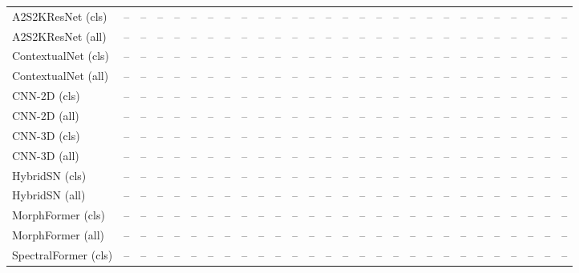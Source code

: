 \begin{longtable}{lrrrrrrrrrrrrrrrrrrrrrrrrrrr}
\addlinespace
A2S2KResNet (cls) & -- & -- & -- & -- & -- & -- & -- & -- & -- & -- & -- & -- & -- & -- & -- & -- & -- & -- & -- & -- & -- & -- & -- & -- & -- & -- & --\\*
A2S2KResNet (all) & -- & -- & -- & -- & -- & -- & -- & -- & -- & -- & -- & -- & -- & -- & -- & -- & -- & -- & -- & -- & -- & -- & -- & -- & -- & -- & --\\
\addlinespace
ContextualNet (cls) & -- & -- & -- & -- & -- & -- & -- & -- & -- & -- & -- & -- & -- & -- & -- & -- & -- & -- & -- & -- & -- & -- & -- & -- & -- & -- & --\\*
ContextualNet (all) & -- & -- & -- & -- & -- & -- & -- & -- & -- & -- & -- & -- & -- & -- & -- & -- & -- & -- & -- & -- & -- & -- & -- & -- & -- & -- & --\\
\addlinespace
CNN-2D (cls) & -- & -- & -- & -- & -- & -- & -- & -- & -- & -- & -- & -- & -- & -- & -- & -- & -- & -- & -- & -- & -- & -- & -- & -- & -- & -- & --\\*
CNN-2D (all) & -- & -- & -- & -- & -- & -- & -- & -- & -- & -- & -- & -- & -- & -- & -- & -- & -- & -- & -- & -- & -- & -- & -- & -- & -- & -- & --\\
\addlinespace
CNN-3D (cls) & -- & -- & -- & -- & -- & -- & -- & -- & -- & -- & -- & -- & -- & -- & -- & -- & -- & -- & -- & -- & -- & -- & -- & -- & -- & -- & --\\*
CNN-3D (all) & -- & -- & -- & -- & -- & -- & -- & -- & -- & -- & -- & -- & -- & -- & -- & -- & -- & -- & -- & -- & -- & -- & -- & -- & -- & -- & --\\
\addlinespace
HybridSN (cls) & -- & -- & -- & -- & -- & -- & -- & -- & -- & -- & -- & -- & -- & -- & -- & -- & -- & -- & -- & -- & -- & -- & -- & -- & -- & -- & --\\*
HybridSN (all) & -- & -- & -- & -- & -- & -- & -- & -- & -- & -- & -- & -- & -- & -- & -- & -- & -- & -- & -- & -- & -- & -- & -- & -- & -- & -- & --\\
\addlinespace
MorphFormer (cls) & -- & -- & -- & -- & -- & -- & -- & -- & -- & -- & -- & -- & -- & -- & -- & -- & -- & -- & -- & -- & -- & -- & -- & -- & -- & -- & --\\*
MorphFormer (all) & -- & -- & -- & -- & -- & -- & -- & -- & -- & -- & -- & -- & -- & -- & -- & -- & -- & -- & -- & -- & -- & -- & -- & -- & -- & -- & --\\
\addlinespace
SpectralFormer (cls) & -- & -- & -- & -- & -- & -- & -- & -- & -- & -- & -- & -- & -- & -- & -- & -- & -- & -- & -- & -- & -- & -- & -- & -- & -- & -- & --\\*

\end{longtable}
